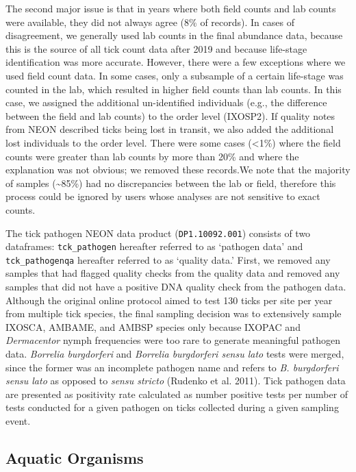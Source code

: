 \documentclass[
  12pt,
]{article}
\begin{document}
The second major issue is that in years where both field counts and lab counts were available, they did not always agree (8\% of records). In cases of disagreement, we generally used lab counts in the final abundance data, because this is the source of all tick count data after 2019 and because life-stage identification was more accurate. However, there were a few exceptions where we used field count data. In some cases, only a subsample of a certain life-stage was counted in the lab, which resulted in higher field counts than lab counts. In this case, we assigned the additional un-identified individuals (e.g., the difference between the field and lab counts) to the order level (IXOSP2). If quality notes from NEON described ticks being lost in transit, we also added the additional lost individuals to the order level. There were some cases (\textless1\%) where the field counts were greater than lab counts by more than 20\% and where the explanation was not obvious; we removed these records.We note that the majority of samples (\textasciitilde85\%) had no discrepancies between the lab or field, therefore this process could be ignored by users whose analyses are not sensitive to exact counts.

The tick pathogen NEON data product (\texttt{DP1.10092.001}) consists of two dataframes: \texttt{tck\_pathogen} hereafter referred to as `pathogen data' and \texttt{tck\_pathogenqa} hereafter referred to as `quality data.' First, we removed any samples that had flagged quality checks from the quality data and removed any samples that did not have a positive DNA quality check from the pathogen data. Although the original online protocol aimed to test 130 ticks per site per year from multiple tick species, the final sampling decision was to extensively sample IXOSCA, AMBAME, and AMBSP species only because IXOPAC and \emph{Dermacentor} nymph frequencies were too rare to generate meaningful pathogen data. \emph{Borrelia burgdorferi} and \emph{Borrelia burgdorferi sensu lato} tests were merged, since the former was an incomplete pathogen name and refers to \emph{B. burgdorferi sensu lato} as opposed to \emph{sensu stricto} (Rudenko et al. 2011). Tick pathogen data are presented as positivity rate calculated as number positive tests per number of tests conducted for a given pathogen on ticks collected during a given sampling event.

\hypertarget{aquatic-organisms}{%
\subsection{Aquatic Organisms}\label{aquatic-organisms}}
\end{document}

